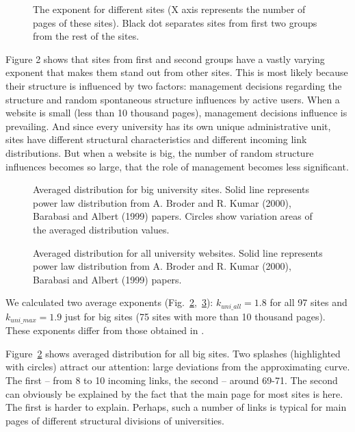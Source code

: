 \begin{figure}[ht]
	\caption{The exponent for different sites (X axis represents the number of pages of these sites). Black dot separates sites from first two groups from the rest of the sites.}\label{fig:sitesExponent}
\end{figure}

Figure 2 shows that sites from first and second groups have a vastly varying exponent that makes them stand out from other sites. This is most likely because their structure is influenced by two factors: management decisions regarding the structure and random spontaneous structure influences by active users. When a website is small (less than 10 thousand pages), management decisions influence is prevailing. And since every university has its own unique administrative unit, sites have different structural characteristics and different incoming link distributions. But when a website is big, the number of random structure influences becomes so large, that the role of management becomes less significant. 

\begin{figure}[ht]
	\caption{Averaged distribution for big university sites. Solid line represents power law distribution from A. Broder and R. Kumar (2000), Barabasi and Albert (1999) papers. Circles show variation areas of the averaged distribution values.}\label{fig:bigUniAveragedDistribution}
\end{figure}

\begin{figure}[ht]
	\caption{Averaged distribution for all university websites. Solid line represents power law distribution from A. Broder and R. Kumar (2000), Barabasi and Albert (1999) papers.}\label{fig:allUniAveragedDistribution}
\end{figure}

We calculated two average exponents (Fig.~\cref{fig:bigUniAveragedDistribution},~\cref{fig:allUniAveragedDistribution}): \(k_\textit{uni\_all} = 1.8\) for all 97 sites and \(k_\textit{uni\_max} = 1.9\) just for big sites (75 sites with more than 10 thousand pages). These exponents differ from those obtained in \cite{BarabasiAlbert,BroderKumarMaghoul}. 

Figure~\cref{fig:bigUniAveragedDistribution} shows averaged distribution for all big sites. Two splashes (highlighted with circles) attract our attention: large deviations from the approximating curve. The first -- from 8 to 10 incoming links, the second -- around 69-71. The second can obviously be explained by the fact that the main page for most sites is here. The first is harder to explain. Perhaps, such a number of links is typical for main pages of different structural divisions of universities.

